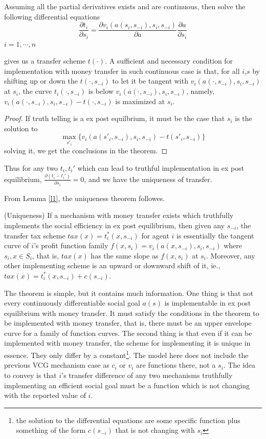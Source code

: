 \begin{lemma}
  \label{l1}
Assuming all the partial derivatives exists and are continuous, then solve the following 
differential equations
 $$\frac{\partial t_i}{\partial s_i} = \frac{\partial v_i(a(s_i,s_{-i}),s_i,s_{-i})}{\partial a } \frac{\partial a}{\partial s_i}$$
 $i=1,\cdots,n$ 
 
 gives us a transfer scheme $t(\cdot)$.
A sufficient and necessary condition for implementation with money transfer in such continuous case is that, for all $i$,$s$
by shifting up or down the $t(\cdot,s_{-i})$ to let it be tangent with $ v_i(a(\cdot,s_{-i}),s_i,s_{-i})$ at $s_i$, the curve
$t_i(\cdot,s_{-i})$ is below $ v_i(a(\cdot,s_{-i}),s_i,s_{-i})$, namely, $v_i(a(\cdot,s_{-i}),s_i,s_{-i})-t(\cdot,s_{-i})$ is
maximized at $s_i$. 
\end{lemma}
\begin{proof}
 If truth telling is a ex post equilbrium, it must be the case that $s_i$ is the solution to
 $$\max_{s'_i} \{v_i(a(s'_i,s_{-i}),s_i,s_{-i})-t(s'_i,s_{-i})\}$$
 solving it, we get the conclusions in the theorem.
\end{proof}

Thus for any two $t_i,t_i'$ which can lead to truthful implementation in ex post equilibrium, $\frac{\partial(t_i-t_i')}{\partial s_i}=0$, and we have the uniqueness of transfer.

From Lemma \ref{l1}, the uniqueness theorem followes.
  \begin{thm}(Uniqueness)
    If a mechanism with money transfer exists which truthfully implements the social efficiency in  ex post equilibrium, then given any $s_{-i}$,  the transfer tax scheme $tax(x)=t_i^*(x,s_{-i})$ for agent $i$ is essentially the tangent curve of $i$'s profit function family  $f(x,s_i)=v_i(a(x,s_{-i}),s_i,s_{-i}) $ where $s_i, x \in S_i$, that is, $tax(x)$ has the same slope as $f(x,s_i)$ at $s_i$. Moreover, any other implementing scheme is an upward or downward shift of it, ie., $tax(x)=t_i^*(x,s_{-i}) + c(s_{-i})$.
  \end{thm}

The theorem is simple, but it contains much information. One thing is that not every continuously differentiable
social goal $a(s)$ is implementable in ex post equilibrium with money transfer. It must satisfy the conditions in the theorem 
to be implemented with money transfer, that is, there must be an upper envelope curve for a family of function curves. The second thing is that even if it can be implemented with money transfer, the scheme for 
implementing it is unique in essence. They only differ by a constant\footnote{the solution to the differential equations are some specific
  function plus something of the form $c(s_{-i})$ that is not changing with $s_i$}. The model here does not include
the previous VCG mechanism case as $c_i$ or $v_i$ are functions there, not a $s_i$. The idea to convey is that $i$'s transfer difference of any two mechanisms truthfully implementing an efficient social goal must be a function which is not changing with the reported value of $i$. 

